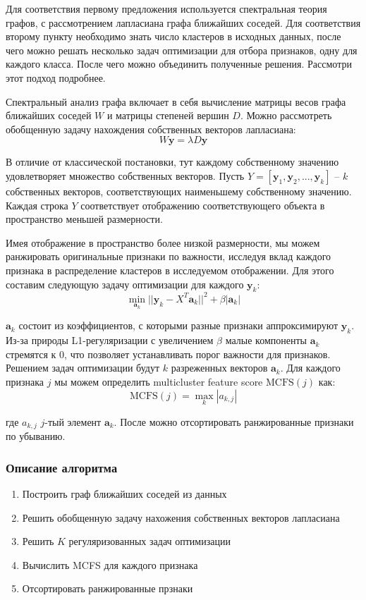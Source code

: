 	Для соответствия первому предложения используется спектральная теория графов, с рассмотрением лапласиана графа ближайших соседей. Для соответствия второму пункту необходимо знать число кластеров в исходных данных, после чего можно решать несколько задач оптимизации для отбора признаков, одну для каждого класса\cite{cai2010unsupervised}. После чего можно объединить полученные решения. Рассмотри этот подход подробнее.

	Спектральный анализ графа включает в себя вычисление матрицы весов графа ближайших соседей $W$ и матрицы степеней вершин $D$. Можно рассмотреть обобщенную задачу нахождения собственных векторов лапласиана:
	\begin{equation}
		W \mathbf{y} = \lambda D \mathbf{y}
	\end{equation}

	 В отличие от классической постановки, тут каждому собственному значению удовлетворяет множество собственных векторов. Пусть 
	 $Y = [\mathbf{y}_1, \mathbf{y}_2,...,\mathbf{y}_k]$ -- $k$ 
	 собственных векторов, соответствующих наименьшему собственному значению. Каждая строка $Y$ соответствует отображению соответствующего объекта в пространство меньшей размерности. 

	 Имея отображение в пространство более низкой размерности, мы можем ранжировать оригинальные признаки по важности, исследуя вклад каждого признака в распределение кластеров в исследуемом отображении. Для этого составим следующую задачу оптимизации для каждого $\mathbf{y}_k$:
	 \begin{equation}
	 	\min_{\mathbf{a}_k} ||\mathbf{y}_k - X^T \mathbf{a}_k||^2 + \beta |\mathbf{a}_k|
	 \end{equation}

	 $\mathbf{a}_k$ состоит из коэффициентов, с которыми разные признаки аппроксимируют $\mathbf{y}_k$. Из-за природы L1-регуляризации с увеличением $\beta$ малые компоненты $\mathbf{a}_k$ стремятся к 0, что позволяет устанавливать порог важности для признаков. Решением задач оптимизации будут $k$ разреженных векторов $\mathbf{a}_k$. Для каждого признака $j$ мы можем определить multicluster feature score $\text{MCFS}(j)$ как:
	 \begin{equation}
	 	\text{MCFS}(j) = \max_k |a_{k,j}|
	 \end{equation}

	 где $a_{k,j}$ $j$-тый элемент $\mathbf{a}_k$. После можно отсортировать ранжированные признаки по убыванию.

	 \subsubsection{Описание алгоритма}
	 \begin{enumerate}
	 	\item Построить граф ближайших соседей из данных
	 	\item Решить обобщенную задачу нахожения собственных векторов лапласиана
	 	\item Решить $K$ регуляризованных задач оптимизации
	 	\item Вычислить MCFS для каждого признака
	 	\item Отсортировать ранжированные прзнаки
	 \end{enumerate}
